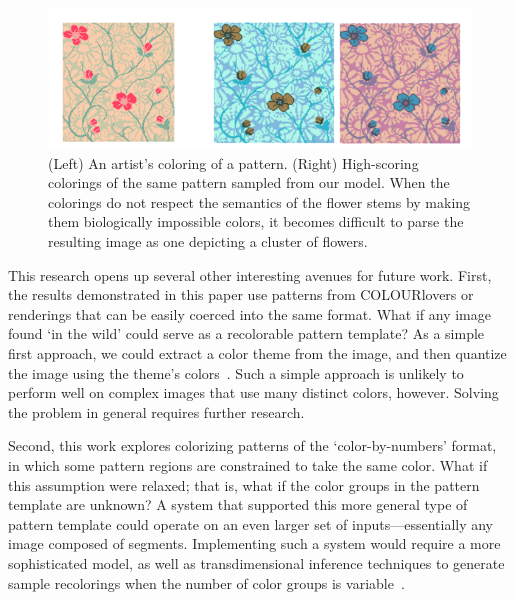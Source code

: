 

\begin{figure}
\centering
\includegraphics[width=0.7\columnwidth]{figs/badFlowers}
\caption{(Left) An artist's coloring of a pattern. (Right) High-scoring colorings of the same pattern sampled from our model. When the colorings do not respect the semantics of the flower stems by making them biologically impossible colors, it becomes difficult to parse the resulting image as one depicting a cluster of flowers.}
\label{fig:badFlowers}
\end{figure}


This research opens up several other interesting avenues for future work.
First, the results demonstrated in this paper use patterns from COLOURlovers or renderings that can be easily coerced into the same format. What if any image found `in the wild' could serve as a recolorable pattern template? As a simple first approach, we could extract a color theme from the image, and then quantize the image using the theme's colors~\cite{SharonPaletteExtraction}. Such a simple approach is unlikely to perform well on complex images that use many distinct colors, however. Solving the problem in general requires further research.

Second, this work explores colorizing patterns of the `color-by-numbers' format, in which some pattern regions are constrained to take the same color. What if this assumption were relaxed; that is, what if the color groups in the pattern template are unknown? A system that supported this more general type of pattern template could operate on an even larger set of inputs---essentially any image composed of segments. Implementing such a system would require a more sophisticated model, as well as transdimensional inference techniques to generate sample recolorings when the number of color groups is variable~\cite{YiTingLARJ}.

